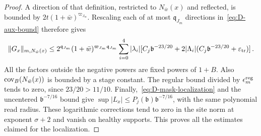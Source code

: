 \begin{proof}
A direction of that definition, restricted to $N_{\bar w}(x)$ and reflected, is bounded by $2t(1+\bar w)^{\varpi_{J_m}}$. Rescaling each of at most $\mathfrak q_{J_m}$ directions in~\eqref{eq:D-aux-bound} therefore gives
\begin{equation*}
\|G_x\|_{m,N_{\bar w}(x)}\le
2^{\mathfrak q_{J_m}}(1+\bar w)^{\varpi_{J_m}\mathfrak q_{J_m}}
\sum_{i=0}^4|\lambda_i|
 [C_j \mathfrak b^{-23/20}+2|\Lambda_i|(C_j \mathfrak b^{-23/20}+\varepsilon_{\rm tr})]\,.
\end{equation*}
All the factors outside the negative powers are fixed powers of $1+B$. Also $\operatorname{cov}_B(N_{\bar w}(x))$ is bounded by a stage constant. The regular bound divided by $\epsilon_m^{\rm reg}$ tends to zero, since $23/20>11/10$. Finally,~\eqref{eq:D-mask-localization} and the uncentered $\mathfrak b^{-7/16}$ bound give $\sup|L_x|\le P_j(\mathfrak b)\mathfrak b^{-7/16}$, with the same polynomial read radius. These logarithmic corrections tend to zero in the site norm at exponent $\sigma+2$ and vanish on healthy supports. This proves all the estimates claimed for the localization.
\end{proof}

